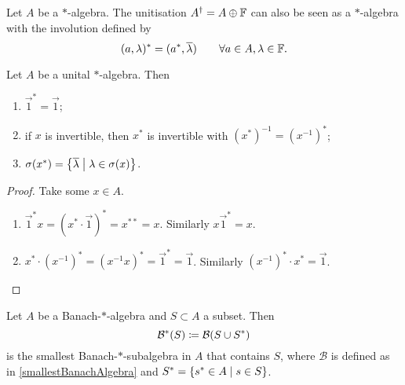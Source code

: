 \begin{lemma}
Let $A$ be a $*$-algebra. The unitisation $A^\dagger = A\oplus \mathbb{F}$ can also be seen as a $*$-algebra with the involution defined by
\[ (a, \lambda)^* = (a^*, \overline{\lambda}) \qquad \forall a\in A, \lambda\in \mathbb{F}.\]
\end{lemma}
\begin{lemma} \label{elementaryStarLemma}
Let $A$ be a unital $*$-algebra. Then
\begin{enumerate}
\item $\vec{1}^* = \vec{1}$;
\item if $x$ is invertible, then $x^*$ is invertible with $(x^*)^{-1} = (x^{-1})^*$;
\item $\sigma(x^*) = \left\{ \overline{\lambda} \;\middle|\; \lambda \in \sigma(x) \right\}$.
\end{enumerate}
\end{lemma}
\begin{proof}
Take some $x\in A$.
\begin{enumerate}
\item $\vec{1}^* x = (x^*\cdot \vec{1})^* = x^{**} = x$.
Similarly $x\vec{1}^* = x$.
\item $x^*\cdot (x^{-1})^* = (x^{-1}x)^* = \vec{1}^* = \vec{1}$. Similarly $(x^{-1})^*\cdot x^* = \vec{1}$.
\end{enumerate}
\end{proof}

\begin{proposition} \label{smallestBanach*Algebra}
Let $A$ be a Banach-$*$-algebra and $S\subset A$ a subset. Then
\[ \mathcal{B}^*(S) \coloneqq \mathcal{B}(S\cup S^*) \]
is the smallest Banach-$*$-subalgebra in $A$ that contains $S$, where $\mathcal{B}$ is defined as in \ref{smallestBanachAlgebra} and $S^* = \left\{ s^*\in A \;\middle|\; s\in S \right\}$.
\end{proposition}


